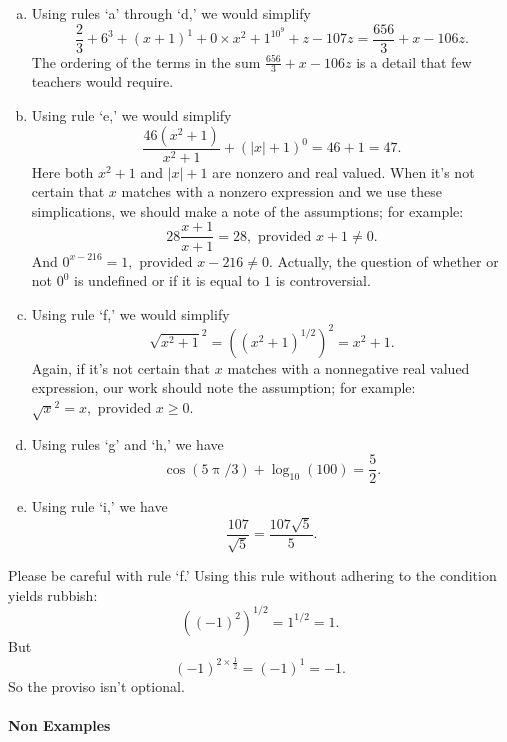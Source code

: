 \documentclass[12pt,fleqn]{article}
\newenvironment{alphalist}{
  \begin{enumerate}[(a)]
    \addtolength{\itemsep}{-0.5\itemsep}}
  {\end{enumerate}}
\begin{document}
\begin{alphalist}

\item Using rules 	`a' through `d,' we would simplify
\[
   \frac{2}{3} +  6^3 + (x+1)^1 + 0 \times x^2  + 1^{10^9}  + z - 107 z = \frac{656}{3} + x - 106 z.
\]
The ordering of the terms in the sum $\frac{656}{3} + x - 106 z$ is a detail that few teachers would require.

\item Using rule `e,' we would simplify
\[
    \frac{46 (x^2+1)}{x^2 + 1} + (|x| + 1)^0 = 46 + 1 = 47.
\]
Here both $x^2 + 1$ and $|x| + 1$ are nonzero and real valued.   When it's not certain that $x$ matches with a nonzero expression and we use
these simplications, we should make a note of the assumptions; for example:
\[
     28 \frac{x + 1}{x+ 1}  = 28, \mbox{ provided } x+ 1 \neq 0.
\]
And
\(
     0^{x - 216} = 1,  \mbox{ provided } x - 216 \neq 0.
\)
Actually, the question of whether or not $0^0$ is undefined or if it is equal to $1$ is controversial. 

\item Using rule `f,' we would simplify
\[
    \sqrt{x^2+1}^2 =  \left( (x^2 + 1)^{1/2} \right)^2 = x^2 + 1.
\]
Again, if it's not certain that $x$ matches with a nonnegative real valued expression, our work should note the assumption; for example:
\(    \sqrt{x}^2 = x, \mbox{ provided } x  \geq 0\).  

\item Using rules `g' and `h,' we have
\[
   \cos(5 \uppi/3) + \log_{10}(100) = \frac{5}{2}.
\]

\item Using rule `i,' we have
\[
    \frac{107}{\sqrt{5}} = \frac{107 \sqrt{5}}{5}.
\]
\end{alphalist}

Please be careful with rule `f.'  Using this rule without adhering to the condition yields rubbish:
\[
   \left( (-1)^2 \right)^{1/2} = 1^{1/2} = 1.
\]
But 
\[
   (-1)^{2 \times \frac{1}{2}} = (-1)^1 = -1.
\]
So the proviso isn't optional.  

\paragraph{Non Examples} 
\end{document}
